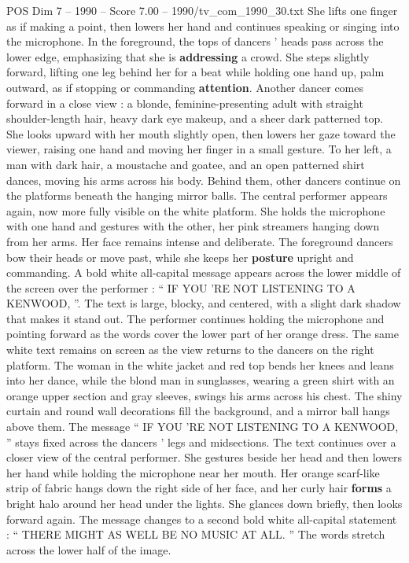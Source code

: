 \begin{textsample}{POS Dim 7 – 1990 – Score 7.00 – 1990/tv\_com\_1990\_30.txt}
She lifts one finger as if making a point, then lowers her hand and continues speaking or singing into the microphone.
In the foreground, the tops of dancers ’ heads pass across the lower edge, emphasizing that she is \textbf{addressing} a crowd.
She steps slightly forward, lifting one leg behind her for a beat while holding one hand up, palm outward, as if stopping or commanding \textbf{attention}.
Another dancer comes forward in a close view : a blonde, feminine-presenting adult with straight shoulder-length hair, heavy dark eye makeup, and a sheer dark patterned top.
She looks upward with her mouth slightly open, then lowers her gaze toward the viewer, raising one hand and moving her finger in a small gesture.
To her left, a man with dark hair, a moustache and goatee, and an open patterned shirt dances, moving his arms across his body.
Behind them, other dancers continue on the platforms beneath the hanging mirror balls.
The central performer appears again, now more fully visible on the white platform.
She holds the microphone with one hand and gestures with the other, her pink streamers hanging down from her arms.
Her face remains intense and deliberate.
The foreground dancers bow their heads or move past, while she keeps her \textbf{posture} upright and commanding.
A bold white all-capital message appears across the lower middle of the screen over the performer : “ IF YOU ’RE NOT LISTENING TO A KENWOOD, ”.
The text is large, blocky, and centered, with a slight dark shadow that makes it stand out.
The performer continues holding the microphone and pointing forward as the words cover the lower part of her orange dress.
The same white text remains on screen as the view returns to the dancers on the right platform.
The woman in the white jacket and red top bends her knees and leans into her dance, while the blond man in sunglasses, wearing a green shirt with an orange upper section and gray sleeves, swings his arms across his chest.
The shiny curtain and round wall decorations fill the background, and a mirror ball hangs above them.
The message “ IF YOU ’RE NOT LISTENING TO A KENWOOD, ” stays fixed across the dancers ’ legs and midsections.
The text continues over a closer view of the central performer.
She gestures beside her head and then lowers her hand while holding the microphone near her mouth.
Her orange scarf-like strip of fabric hangs down the right side of her face, and her curly hair \textbf{forms} a bright halo around her head under the lights.
She glances down briefly, then looks forward again.
The message changes to a second bold white all-capital statement : “ THERE MIGHT AS WELL BE NO MUSIC AT ALL. ” The words stretch across the lower half of the image.

\end{textsample}
